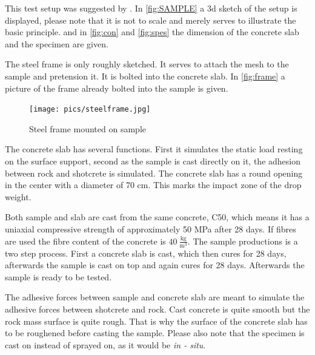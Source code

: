 This test setup was suggested by \textcite{Erik15}. In \autoref{fig:SAMPLE} a 3d sketch of the setup is displayed, please note that it is not to scale and merely serves to illustrate the basic principle. and in \autoref{fig:con} and \autoref{fig:spes} the dimension of the concrete slab and the specimen are given. %

The steel frame is only roughly sketched. It serves to attach the mesh to the sample and pretension it. It is bolted into the concrete slab. In \autoref{fig:frame} a picture of the frame already bolted into the sample is given.

\begin{figure}
    \centering
    \texttt{[image: pics/steelframe.jpg]}
    \caption{Steel frame mounted on sample}
    \label{fig:frame}
\end{figure}

The concrete slab has several functions. First it simulates the static load resting on the surface support, second as the sample is cast directly on it, the adhesion between rock and shotcrete is simulated. The concrete slab has a round opening in the center with a diameter of 70 cm. This marks the impact zone of the drop weight.  

Both sample and slab are cast from the same concrete, C50, which means it has a uniaxial compressive strength of approximately 50 MPa after 28 days. If fibres are used the fibre content of the concrete is \(40 ~\frac{\text{kg}}{\text{m}^3}\). The sample productions is a two step process. First a concrete slab is cast, which then cures for 28 days, afterwards the sample is cast on top and again cures for 28 days. Afterwards the sample is ready to be tested. 

The adhesive forces between sample and concrete slab are meant to simulate the adhesive forces between shotcrete and rock. Cast concrete is quite smooth but the rock mass surface is quite rough. That is why the surface of the concrete slab has to be roughened before casting the sample. Please also note that the specimen is cast on instead of sprayed on, as it would be \textit{in - situ}. 

